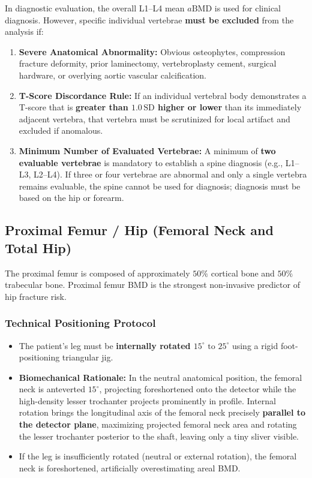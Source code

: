 \documentclass[11pt,a4paper]{article}
\begin{document}
\begin{qcbox}
In diagnostic evaluation, the overall L1--L4 mean $a\text{BMD}$ is used for clinical diagnosis. However, specific individual vertebrae \textbf{must be excluded} from the analysis if:
\begin{enumerate}[leftmargin=*]
    \item \textbf{Severe Anatomical Abnormality:} Obvious osteophytes, compression fracture deformity, prior laminectomy, vertebroplasty cement, surgical hardware, or overlying aortic vascular calcification.
    \item \textbf{T-Score Discordance Rule:} If an individual vertebral body demonstrates a T-score that is \textbf{greater than $1.0\,\text{SD}$ higher or lower} than its immediately adjacent vertebra, that vertebra must be scrutinized for local artifact and excluded if anomalous.
    \item \textbf{Minimum Number of Evaluated Vertebrae:} A minimum of \textbf{two evaluable vertebrae} is mandatory to establish a spine diagnosis (e.g., L1--L3, L2--L4). If three or four vertebrae are abnormal and only a single vertebra remains evaluable, the spine cannot be used for diagnosis; diagnosis must be based on the hip or forearm.
\end{enumerate}
\end{qcbox}

\subsection{Proximal Femur / Hip (Femoral Neck and Total Hip)}

The proximal femur is composed of approximately $50\%$ cortical bone and $50\%$ trabecular bone. Proximal femur BMD is the strongest non-invasive predictor of hip fracture risk.

\subsubsection{Technical Positioning Protocol}
\begin{itemize}[leftmargin=*]
    \item The patient's leg must be \textbf{internally rotated $15^\circ\text{ to }25^\circ$} using a rigid foot-positioning triangular jig.
    \item \textbf{Biomechanical Rationale:} In the neutral anatomical position, the femoral neck is anteverted $15^\circ$, projecting foreshortened onto the detector while the high-density lesser trochanter projects prominently in profile. Internal rotation brings the longitudinal axis of the femoral neck precisely \textbf{parallel to the detector plane}, maximizing projected femoral neck area and rotating the lesser trochanter posterior to the shaft, leaving only a tiny sliver visible.
    \item If the leg is insufficiently rotated (neutral or external rotation), the femoral neck is foreshortened, artificially overestimating areal BMD.
\end{itemize}
\end{document}
